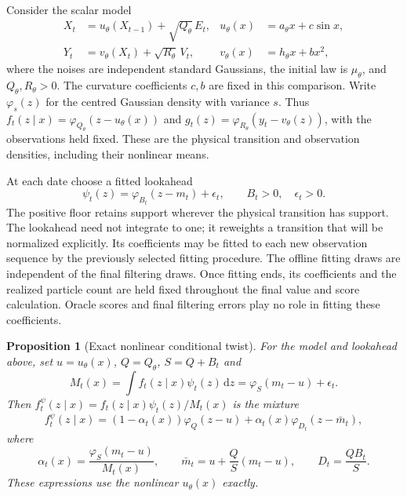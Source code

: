 \documentclass[11pt]{article}
\newtheorem{proposition}{Proposition}
\newcommand{\dd}{\mathrm{d}}
\begin{document}
Consider the scalar model
\begin{align}
 X_t&=u_\theta(X_{t-1})+\sqrt{Q_\theta}\,E_t,
 &u_\theta(x)&=a_\theta x+c\sin x,\\
 Y_t&=v_\theta(X_t)+\sqrt{R_\theta}\,V_t,
 &v_\theta(x)&=h_\theta x+b x^2,
 \label{eq:nonlinear-twist-model}
\end{align}
where the noises are independent standard Gaussians, the initial law is
$\mu_\theta$, and $Q_\theta,R_\theta>0$. The curvature coefficients $c,b$
are fixed in this comparison. Write $\varphi_s(z)$ for the centred Gaussian
density with variance $s$. Thus
$f_t(z\mid x)=\varphi_{Q_\theta}(z-u_\theta(x))$ and
$g_t(z)=\varphi_{R_\theta}(y_t-v_\theta(z))$, with the observations held fixed.
These are the physical transition and observation densities, including their
nonlinear means.

At each date choose a fitted lookahead
\begin{equation}
 \psi_t(z)=\varphi_{B_t}(z-m_t)+\epsilon_t,
 \qquad B_t>0,\quad\epsilon_t>0.
 \label{eq:nonlinear-twist-family}
\end{equation}
The positive floor retains support wherever the physical transition has
support. The lookahead need not integrate to one; it reweights a transition
that will be normalized explicitly. Its coefficients may be fitted to each
new observation sequence by the previously selected fitting procedure. The
offline fitting draws are independent of the final filtering draws. Once
fitting ends, its coefficients and the realized particle count are held fixed
throughout the final value and score calculation. Oracle scores and final
filtering errors play no role in fitting these coefficients.

\begin{proposition}[Exact nonlinear conditional twist]
\label{prop:nonlinear-conditional-twist}
For the model and lookahead above, set $u=u_\theta(x)$, $Q=Q_\theta$,
$S=Q+B_t$ and
\begin{equation}
 M_t(x)=\int f_t(z\mid x)\psi_t(z)\,\dd z
       =\varphi_S(m_t-u)+\epsilon_t.
 \label{eq:nonlinear-twist-normalizer}
\end{equation}
Then $f_t^\psi(z\mid x)=f_t(z\mid x)\psi_t(z)/M_t(x)$ is the mixture
\begin{equation}
 f_t^\psi(z\mid x)
  =(1-\alpha_t(x))\varphi_Q(z-u)
    +\alpha_t(x)\varphi_{D_t}(z-\bar m_t),
 \label{eq:nonlinear-twist-mixture}
\end{equation}
where
\[
 \alpha_t(x)=\frac{\varphi_S(m_t-u)}{M_t(x)},\qquad
 \bar m_t=u+\frac{Q}{S}(m_t-u),\qquad
 D_t=\frac{QB_t}{S}.
\]
These expressions use the nonlinear $u_\theta(x)$ exactly.
\end{proposition}
\end{document}
